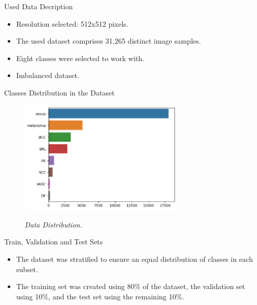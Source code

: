 \documentclass[dvipsnames,mathserif]{beamer}
\begin{document}
{\begin{frame}
      \large Used Data Decription
      \vspace{0.25cm}

      \footnotesize

      \begin{itemize}
        \item Resolution selected: 512x512 pixels.
        \item The used dataset comprises 31,265 distinct image samples.
        \item Eight classes were selected to work with.
        \item Imbalanced dataset.
      \end{itemize}

    \end{frame}

    \begin{frame}

      \large Classes Distribution in the Dataset
          \vspace{0.25cm}

      \begin{figure}[H]
        \centering
        \includegraphics[width=0.7\textwidth]{images/hole-dataset-diagnosis.png}
        \caption[Data Distribution]{\textit{Data Distribution. }}
        {\label{fig:hole-dataset-distribution}}
      \end{figure}

    \end{frame}

    \begin{frame}

      \large  Train, Validation and Test Sets
      \vspace{0.25cm}

      \footnotesize

      \begin{itemize}
        \item The dataset was stratified to ensure an equal distribution of classes in each subset.
        \item The training set was created using 80\% of the dataset, the validation set using 10\%, and the test set using the remaining 10\%.
      \end{itemize}



\end{frame}}
\end{document}
